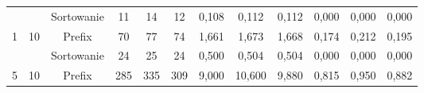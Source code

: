 \documentclass[magisterska]{pracamgr}
\begin{document}
\begin{table}[H]
{\begin{tabular}{@{}cccccccccccc@{}}
                                                                &                                                         & Sortowanie & 11                                                      & 14                                                      & 12                                                         & 0,108                                                      & 0,112                                                      & 0,112                                                          & 0,000                                                              & 0,000                                                               & 0,000                                                                 \\
1                                                               & 10                                                      & Prefix     & 70                                                      & 77                                                      & 74                                                         & 1,661                                                      & 1,673                                                      & 1,668                                                          & 0,174                                                              & 0,212                                                               & 0,195                                                                 \\ \midrule
                                                                &                                                         & Sortowanie & 24                                                      & 25                                                      & 24                                                         & 0,500                                                      & 0,504                                                      & 0,504                                                          & 0,000                                                              & 0,000                                                               & 0,000                                                                 \\
5                                                               & 10                                                      & Prefix     & 285                                                     & 335                                                     & 309                                                        & 9,000                                                      & 10,600                                                     & 9,880                                                          & 0,815                                                              & 0,950                                                               & 0,882                                                                 \\ \bottomrule
\end{tabular}%
}
\end{table}
\end{document}
